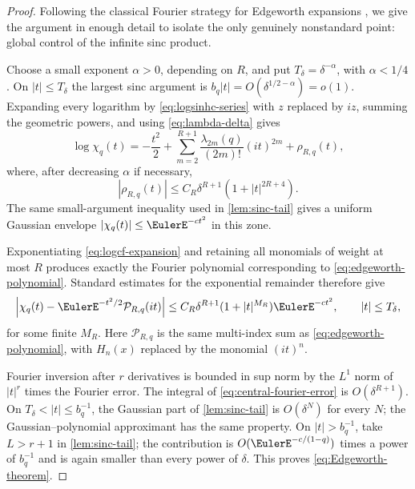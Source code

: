 \documentclass[11pt,a4paper]{article}
\theoremstyle{definition}
\begin{document}
\begin{proof}
Following the classical Fourier strategy for Edgeworth expansions
\cite{BhattacharyaRao,Petrov}, we give the argument in enough detail to isolate the only genuinely
nonstandard point: global control of the infinite sinc product.

Choose a small exponent $\alpha>0$, depending on $R$, and put
$T_\delta=\delta^{-\alpha}$, with $\alpha<1/4$.  On
$|t|\le T_\delta$ the largest sinc argument is
$b_q|t|=O(\delta^{1/2-\alpha})=o(1)$.  Expanding every logarithm by
\eqref{eq:logsinhc-series} with $z$ replaced by $iz$, summing the geometric
powers, and using \eqref{eq:lambda-delta} gives
\begin{equation}
 \log\chi_q(t)
 =-\frac{t^2}{2}
 +\sum_{m=2}^{R+1}
   \frac{\lambda_{2m}(q)}{(2m)!}(it)^{2m}
 +\rho_{R,q}(t),
 \label{eq:logcf-expansion}
\end{equation}
where, after decreasing $\alpha$ if necessary,
\begin{equation}
 |\rho_{R,q}(t)|
 \le C_R\delta^{R+1}(1+|t|^{2R+4}).
 \label{eq:logcf-remainder}
\end{equation}
The same small-argument inequality used in \cref{lem:sinc-tail} gives a
uniform Gaussian envelope $|\chi_q(t)|\le \EulerE^{-ct^2}$ in this zone.

Exponentiating \eqref{eq:logcf-expansion} and retaining all monomials of
weight at most $R$ produces exactly the Fourier polynomial corresponding to
\eqref{eq:edgeworth-polynomial}.  Standard estimates for the exponential
remainder therefore give
\begin{equation}
 \left|\chi_q(t)-\EulerE^{-t^2/2}\mathcal P_{R,q}(it)\right|
 \le C_R\delta^{R+1}(1+|t|^{M_R})\EulerE^{-ct^2},
 \qquad |t|\le T_\delta,
 \label{eq:central-fourier-error}
\end{equation}
for some finite $M_R$.  Here $\mathcal P_{R,q}$ is the same multi-index sum
as \eqref{eq:edgeworth-polynomial}, with $H_n(x)$ replaced by the monomial
$(it)^n$.

Fourier inversion after $r$ derivatives is bounded in sup norm by the
$L^1$ norm of $|t|^r$ times the Fourier error.  The integral of
\eqref{eq:central-fourier-error} is $O(\delta^{R+1})$.  On
$T_\delta<|t|\le b_q^{-1}$, the Gaussian part of
\cref{lem:sinc-tail} is $O(\delta^N)$ for every $N$; the Gaussian--polynomial
approximant has the same property.  On $|t|>b_q^{-1}$, take
$L>r+1$ in \cref{lem:sinc-tail}; the contribution is
$O(\EulerE^{-c/(1-q)})$ times a power of $b_q^{-1}$ and is again smaller than every
power of $\delta$.  This proves \eqref{eq:Edgeworth-theorem}.
\end{proof}
\end{document}
